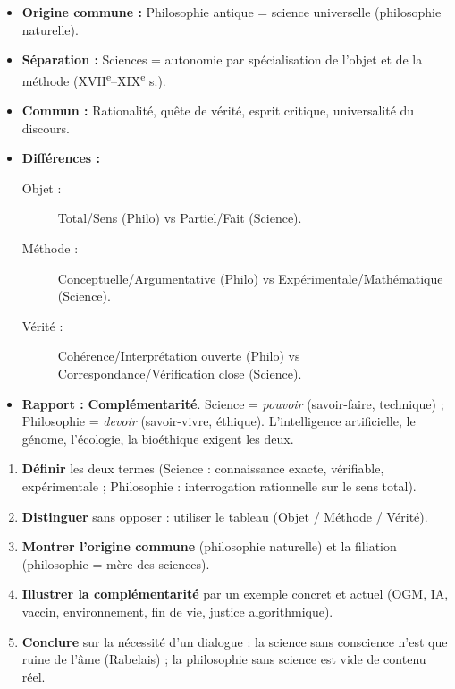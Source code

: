 \documentclass[11pt]{article}
\begin{document}
\begin{aretenir}
\begin{itemize}
    \item \textbf{Origine commune :} Philosophie antique = science universelle (philosophie naturelle).
    \item \textbf{Séparation :} Sciences = autonomie par spécialisation de l'objet et de la méthode (XVII\textsuperscript{e}--XIX\textsuperscript{e} s.).
    \item \textbf{Commun :} Rationalité, quête de vérité, esprit critique, universalité du discours.
    \item \textbf{Différences :}
    \begin{description}
        \item[Objet :] Total/Sens (Philo) vs Partiel/Fait (Science).
        \item[Méthode :] Conceptuelle/Argumentative (Philo) vs Expérimentale/Mathématique (Science).
        \item[Vérité :] Cohérence/Interprétation ouverte (Philo) vs Correspondance/Vérification close (Science).
    \end{description}
    \item \textbf{Rapport :} \textbf{Complémentarité}. Science = \emph{pouvoir} (savoir-faire, technique) ; Philosophie = \emph{devoir} (savoir-vivre, éthique). L'intelligence artificielle, le génome, l'écologie, la bioéthique exigent les deux.
\end{itemize}
\end{aretenir}

\begin{methode}
\begin{enumerate}
    \item \textbf{Définir} les deux termes (Science : connaissance exacte, vérifiable, expérimentale ; Philosophie : interrogation rationnelle sur le sens total).
    \item \textbf{Distinguer} sans opposer : utiliser le tableau (Objet / Méthode / Vérité).
    \item \textbf{Montrer l'origine commune} (philosophie naturelle) et la filiation (philosophie = mère des sciences).
    \item \textbf{Illustrer la complémentarité} par un exemple concret et actuel (OGM, IA, vaccin, environnement, fin de vie, justice algorithmique).
    \item \textbf{Conclure} sur la nécessité d'un dialogue : la science sans conscience n'est que ruine de l'âme (Rabelais) ; la philosophie sans science est vide de contenu réel.
\end{enumerate}
\end{methode}
\end{document}

